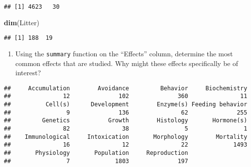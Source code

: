 \documentclass[
]{article}
\newenvironment{Shaded}{\begin{snugshade}}{\end{snugshade}}
\newcommand{\CommentTok}[1]{\textcolor[rgb]{0.56,0.35,0.01}{\textit{#1}}}
\newcommand{\KeywordTok}[1]{\textcolor[rgb]{0.13,0.29,0.53}{\textbf{#1}}}
\newcommand{\NormalTok}[1]{#1}
\newcommand{\OperatorTok}[1]{\textcolor[rgb]{0.81,0.36,0.00}{\textbf{#1}}}
\providecommand{\tightlist}{%
  \setlength{\itemsep}{0pt}\setlength{\parskip}{0pt}}
\begin{document}
\begin{verbatim}
## [1] 4623   30
\end{verbatim}

\begin{Shaded}
\begin{Highlighting}[]
\KeywordTok{dim}\NormalTok{(Litter)}
\end{Highlighting}
\end{Shaded}

\begin{verbatim}
## [1] 188  19
\end{verbatim}

\begin{enumerate}
\def\labelenumi{\arabic{enumi}.}
\setcounter{enumi}{5}
\tightlist
\item
  Using the \texttt{summary} function on the ``Effects'' column,
  determine the most common effects that are studied. Why might these
  effects specifically be of interest?
\end{enumerate}

\begin{Shaded}
\end{Shaded}

\begin{verbatim}
##     Accumulation        Avoidance         Behavior     Biochemistry 
##               12              102              360               11 
##          Cell(s)      Development        Enzyme(s) Feeding behavior 
##                9              136               62              255 
##         Genetics           Growth        Histology       Hormone(s) 
##               82               38                5                1 
##    Immunological     Intoxication       Morphology        Mortality 
##               16               12               22             1493 
##       Physiology       Population     Reproduction 
##                7             1803              197
\end{verbatim}
\end{document}
